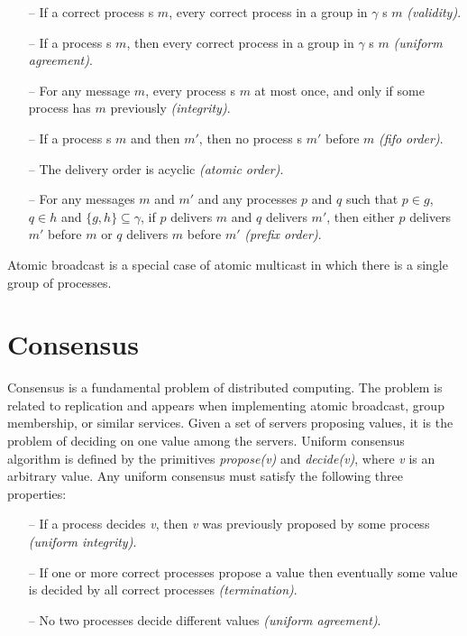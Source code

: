 \begin{itemize}

    \item[--] If a correct process \amcast{}s $m$, every correct process in a
      group in $\gamma$ \amdel{}s $m$ \emph{(validity)}.

    \item[--] If a process \amdel{}s $m$, then every correct process in a group
      in $\gamma$ \amdel{}s $m$ \emph{(uniform agreement)}.

    \item[--] For any message $m$, every process \amdel{}s $m$ at most once, and
      only if some process has \amcast{} $m$ previously \emph{(integrity)}.

    \item[--] If a process \amcast{}s $m$ and then $m'$, then no process
    \amdel{}s $m'$ before $m$ \emph{(fifo order)}.

    \item[--] The delivery order is acyclic \emph{(atomic order)}.

    \item[--] For any messages $m$ and $m'$ and any processes $p$ and $q$ such
      that $p \in g$, $q \in h$ and $\{ g, h \} \subseteq \gamma$, if $p$
      delivers $m$ and $q$ delivers $m'$, then either $p$ delivers $m'$ before
      $m$ or $q$ delivers $m$ before $m'$ \emph{(prefix order)}.

\end{itemize}

Atomic broadcast is a special case of atomic multicast in which there
is a single group of processes.

\section{Consensus}
Consensus is a fundamental problem of distributed computing. The problem is
related to replication and appears when implementing atomic broadcast, group
membership, or similar services. Given a set of servers proposing values, it is
the problem of deciding on one value among the servers. Uniform consensus
algorithm  is defined by the primitives \emph{propose(v)} and \emph{decide(v)},
where \emph{v} is an arbitrary value. Any uniform consensus must satisfy the
following three properties:
\begin{itemize}

  \item[--] If a process decides \emph{v}, then \emph{v} was previously
  proposed by some process \emph{(uniform integrity)}.

  \item[--] If one or more correct processes propose a value then eventually
  some value is decided by all correct processes \emph{(termination)}.

  \item[--] No two processes decide different values \emph{(uniform agreement)}.

\end{itemize}

